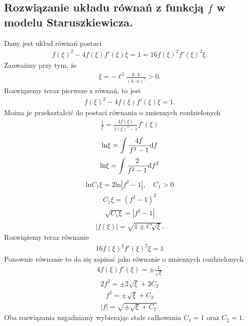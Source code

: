\subsection{Rozwiązanie układu równań z 
funkcją $f$ w modelu Staruszkiewicza.}
\noindent
Dany jest układ równań postaci 
\begin{align*} 
 f(\xi)^2- 4 f(\xi) f'(\xi) \xi
 =  1 =
  16   f(\xi)^2 f'(\xi)^2 \xi .
\end{align*}
Zauważmy przy tym, że 
\begin{align*}
\xi = - \ell^2 \frac{\dot{k} \cdot \dot{k}}{ ( k \cdot \dot{x})^2 } > 0.
\end{align*}
Rozwiązemy teraz pierwsze z równań, to jest
\begin{align*} 
 f(\xi)^2- 4 f(\xi) f'(\xi) \xi =  1 .
\end{align*}
Można je przekształcić do postaci równania o zmiennych 
rozdzielonych
\begin{align*} 
\frac{1}{\xi} = \frac{ 4 f(\xi) }{ f(\xi)^2-1} f'(\xi) 
\end{align*}
\begin{align*} 
\text{ln} \xi = \int \frac{ 4 f }{ f^2-1} \text{d} f 
\end{align*}
\begin{align*} 
\text{ln} \xi = \int \frac{ 2 }{ f^2-1} \text{d} f^2 
\end{align*}
\begin{align*} 
\text{ln} C_1 \xi = 2\text{ln}|f^2-1|, \quad C_1>0
\end{align*}
\begin{align*} 
 C_1 \xi  = (f^2-1)^2 
\end{align*}
\begin{align*} 
 \sqrt{ C_1 \xi}  = | f^2-1 | 
\end{align*}
\begin{align*} 
|f(\xi)| =  \sqrt{ 1 \pm C\sqrt{ \xi} }. 
\end{align*}
Rozwiążemy teraz równanie
\begin{align*} 
  16   f(\xi)^2 f'(\xi)^2 \xi  = 1
\end{align*}
Ponownie równanie to da się zapisać jako równanie o 
zmiennych rozdzielonych
\begin{align*} 
  4  f(\xi) f'(\xi)   =\pm \frac{1}{\sqrt{\xi}}
\end{align*}
\begin{align*} 
  2 f^2   =\pm 2 \sqrt{\xi} + 2 C_2
\end{align*}
\begin{align*} 
   f^2   =\pm  \sqrt{\xi} + C_2
\end{align*}
\begin{align*} 
   |f|   =\sqrt{ \pm  \sqrt{\xi} + C_2 }.
\end{align*}
Oba rozwiązania uzgadniamy wybierając 
stałe całkowania $C_1 = 1$ oraz $C_2=1$.



